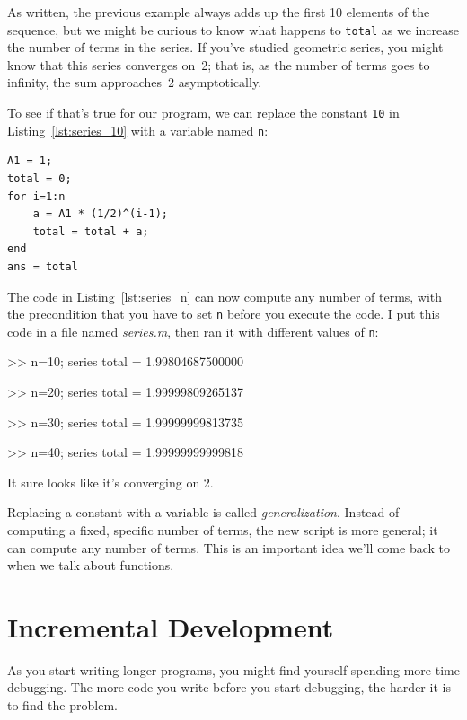 
As written, the previous example always adds up the first 10
elements of the sequence, but we might be curious to know what
happens to \lstinline{total} as we increase the
number of terms in the series.  If you've studied geometric
series, you might know that this series converges on~2; that is,
as the number of terms goes to infinity, the sum approaches~2 asymptotically.

To see if that's true for our program, we can replace the
constant \lstinline{10} in Listing~\ref{lst:series_10} with a variable named \lstinline{n}:

\begin{lstlisting}[caption={Updating our code from Listing~\ref{lst:series_10} to have a variable number of terms}, label={lst:series_n}]
A1 = 1;
total = 0;
for i=1:n
    a = A1 * (1/2)^(i-1);
    total = total + a;
end
ans = total
\end{lstlisting}

The code in Listing~\ref{lst:series_n} can now compute any number of terms, with the
precondition that you have to set \lstinline{n} before you execute
the code.
I put this code in a file named \emph{series.m}, then
ran it with different values of \lstinline{n}:

\begin{code}
>> n=10; series
total = 1.99804687500000

>> n=20; series
total = 1.99999809265137

>> n=30; series
total = 1.99999999813735

>> n=40; series
total = 1.99999999999818
\end{code}

It sure looks like it's converging on 2.

Replacing a constant with a variable is called \emph{generalization}.
Instead of computing a fixed, specific number of terms, the new script
is more general; it can compute any number of terms.
This is an important idea we'll come back to when we talk about functions.

\section{Incremental Development}


As you start writing longer programs, you might find yourself spending more time debugging.
The more code you write before you start debugging, the harder it is to find
the problem.

